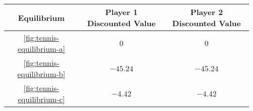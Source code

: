 
\setlength{\extrarowheight}{3pt}

\begin{tabular}{ccc}

    \toprule
    Equilibrium                        & Player 1 Discounted Value & Player 2 Discounted Value \\
    \midrule
    \autoref{fig:tennis-equilibrium-a} & $0$                       & $0$                       \\
    \autoref{fig:tennis-equilibrium-b} & $-45.24$                  & $-45.24$                  \\
    \autoref{fig:tennis-equilibrium-c} & $-4.42$                   & $-4.42$                   \\
    \bottomrule

\end{tabular}

\setlength{\extrarowheight}{0pt}
